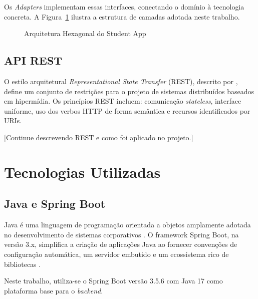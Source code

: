 Os \textit{Adapters} implementam essas interfaces, conectando o domínio à tecnologia
concreta. A Figura~\ref{fig:arquitetura-hexagonal} ilustra a estrutura de camadas
adotada neste trabalho.

\begin{figure}[H]
  \centering
  \caption{Arquitetura Hexagonal do Student App}
  \label{fig:arquitetura-hexagonal}
\end{figure}

\subsection{API REST}
\label{subsec:api-rest}

O estilo arquitetural \textit{Representational State Transfer} (REST), descrito por
, define um conjunto de restrições para o
projeto de sistemas distribuídos baseados em hipermídia. Os princípios REST incluem:
comunicação \textit{stateless}, interface uniforme, uso dos verbos HTTP de forma
semântica e recursos identificados por URIs.

[Continue descrevendo REST e como foi aplicado no projeto.]

\section{Tecnologias Utilizadas}
\label{sec:tecnologias}

\subsection{Java e Spring Boot}
\label{subsec:spring-boot}

Java é uma linguagem de programação orientada a objetos amplamente adotada no
desenvolvimento de sistemas corporativos \cite{[REFERENCIA_JAVA]}. O framework
Spring Boot, na versão 3.x, simplifica a criação de aplicações Java ao fornecer
convenções de configuração automática, um servidor embutido e um ecossistema rico
de bibliotecas \cite{[REFERENCIA_SPRING]}.

Neste trabalho, utiliza-se o Spring Boot versão 3.5.6 com Java 17 como plataforma
base para o \textit{backend}.

